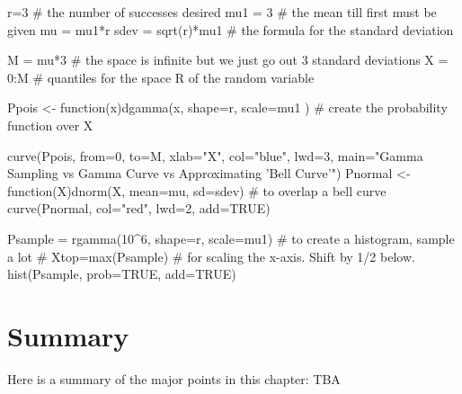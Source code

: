 \documentclass[10pt,]{book}
\numberwithin{equation}{section}
\begin{document}
%
\par
\hypertarget{p-1146}{}%
\leavevmode%
\begin{sageinput}
r=3                # the number of successes desired
mu1 = 3            # the mean till first must be given
mu = mu1*r
sdev = sqrt(r)*mu1  # the formula for the standard deviation

M = mu*3   # the space is infinite but we just go out 3 standard deviations
X = 0:M    # quantiles for the space R of the random variable 

Ppois <- function(x){dgamma(x, shape=r, scale=mu1 )}  # create the probability function over X

curve(Ppois, from=0, to=M, xlab="X", col="blue", lwd=3,
 main="Gamma Sampling vs Gamma Curve vs Approximating 'Bell Curve'") 
Pnormal <- function(X){dnorm(X, mean=mu, sd=sdev)}   # to overlap a bell curve
curve(Pnormal, col="red", lwd=2, add=TRUE) 

Psample = rgamma(10^6, shape=r, scale=mu1)  # to create a histogram, sample a lot
# Xtop=max(Psample)          # for scaling the x-axis. Shift by 1/2 below.
hist(Psample, prob=TRUE, add=TRUE)
\end{sageinput}
%
%
%
\typeout{************************************************}
\typeout{************************************************}
%
\section[{Summary}]{Summary}\label{section-55}
\hypertarget{p-1147}{}%
Here is a summary of the major points in this chapter:%
\hypertarget{p-1148}{}%
TBA%
%
%
\typeout{************************************************}
\typeout{************************************************}
%
\end{document}
